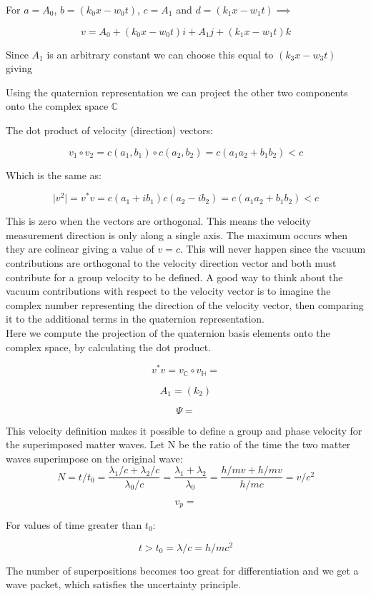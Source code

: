 \documentclass{article}
\begin{document}
For $a=A_0$, $b=(k_0 x-w_0t)$, $c=A_1$ and $d=(k_1 x-w_1t) \implies$

$$v=A_0+(k_0 x-w_0t)i+A_1j+(k_1 x-w_1t)k$$

Since $A_1$ is an arbitrary constant we can choose this equal to $(k_3 x-w_3t)$ giving 


Using the quaternion representation we can project the other two components onto the complex space $\mathbb{C}$ 



The dot product of velocity (direction) vectors:

$$v_1 \circ v_2=c(a_1, b_1)\circ c(a_2, b_2)=c(a_1 a_2 + b_1 b_2)<c$$

Which is the same as:

$$\lvert v^2 \rvert =v^*v=c(a_1+ib_1)c(a_2-ib_2)=c(a_1 a_2+b_1 b_2)<c$$

This is zero when the vectors are orthogonal. This means the velocity measurement direction is only along a single axis. The maximum occurs when they are colinear giving a value of $v=c$. This will never happen since the vacuum contributions are orthogonal to the velocity direction vector and both must contribute for a group velocity to be defined. A good way to think about the vacuum contributions with respect to the velocity vector is to imagine the complex number representing the direction of the velocity vector, then comparing it to the additional terms in the quaternion representation.\\

Here we compute the projection of the quaternion basis elements onto the complex space, by calculating the dot product.

$$v^*v=v_\mathbb{C} \circ v_\mathbb{H} = $$



$$A_1=(k_2 )$$

$$\Psi=$$

This velocity definition makes it possible to define a group and phase velocity for the superimposed matter waves. Let N be the ratio of the time the two matter waves superimpose on the original wave:
$$N=t/t_0=\frac{\lambda_1/c+\lambda_2/c}{\lambda_0/c}=\frac{\lambda_1+\lambda_2}{\lambda_0}=\frac{h/mv+h/mv}{h/mc}=v/c^2$$

$$v_p=$$

For values of time greater than $t_0$:

$$t>t_0=\lambda /c=h/mc^2$$

The number of superpositions becomes too great for differentiation and we get a wave packet, which satisfies the uncertainty principle.
\end{document}

